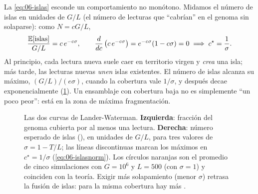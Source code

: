 La \cref{eq:06-islas} esconde un comportamiento no monótono. Midamos el número de islas en unidades de $G/L$ (el número de lecturas que ``cabrían'' en el genoma sin solaparse): como $N=cG/L$,
\begin{equation}\label{eq:06-islasnorm}
\frac{\mathbb{E}[\text{islas}]}{G/L} = c\,e^{-c\sigma},\qquad
\frac{d}{dc}\left(c\,e^{-c\sigma}\right) = e^{-c\sigma}(1-c\sigma) = 0
\;\Longrightarrow\; c^{\star}=\frac{1}{\sigma}.
\end{equation}
Al principio, cada lectura nueva suele caer en territorio virgen y \emph{crea} una isla; más tarde, las lecturas nuevas \emph{unen} islas existentes. El número de islas alcanza su máximo, $(G/L)/(e\sigma)$, cuando la cobertura vale $1/\sigma$, y después decae exponencialmente (\cref{fig:06-lw}). Un ensamblaje con cobertura baja no es simplemente ``un poco peor'': está en la zona de máxima fragmentación.

\begin{figure}[t]
\centering
{}
\caption[Curvas de Lander-Waterman]{Las dos curvas de Lander-Waterman. \textbf{Izquierda}: fracción del genoma cubierta por al menos una lectura. \textbf{Derecha}: número esperado de islas (), en unidades de $G/L$, para tres valores de $\sigma=1-T/L$; las líneas discontinuas marcan los máximos en $c^\star=1/\sigma$ (\cref{eq:06-islasnorm}). Los círculos naranjas son el promedio de cinco simulaciones con $G=10^6$ y $L=500$ (con $\sigma=1$) y coinciden con la teoría. Exigir más solapamiento (menor $\sigma$) retrasa la fusión de islas: para la misma cobertura hay más .}
\label{fig:06-lw}
\end{figure}

